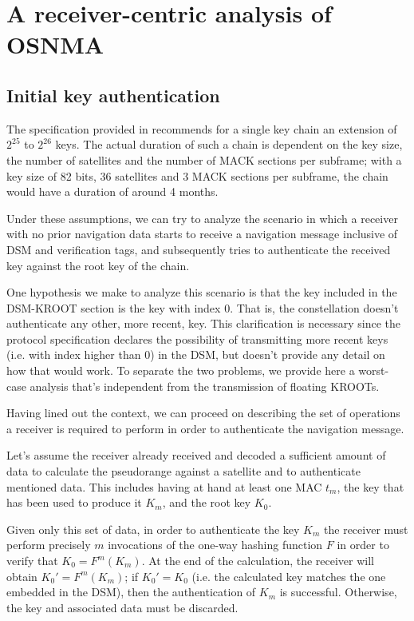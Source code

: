 \chapter{A receiver-centric analysis of OSNMA}

\section{Initial key authentication}
The specification provided in \cite{osnma} recommends for a single key chain
an extension of $2^{25}$ to $2^{26}$ keys. The actual duration of such a chain
is dependent on the key size, the number of satellites and the number of MACK
sections per subframe; with a key size of 82 bits, 36 satellites and 3 MACK
sections per subframe, the chain would have a duration of around 4 months.

Under these assumptions, we can try to analyze the scenario in which a receiver
with no prior navigation data starts to receive a navigation message inclusive
of DSM and verification tags, and subsequently tries to authenticate the
received key against the root key of the chain.

One hypothesis we make to analyze this scenario is that the key included in the
DSM-KROOT section is the key with index $0$. That is, the constellation doesn't
authenticate any other, more recent, key. This clarification is necessary since
the protocol specification declares the possibility of transmitting more recent
keys (i.e. with index higher than $0$) in the DSM, but doesn't provide any
detail on how that would work. To separate the two problems, we provide here a
worst-case analysis that's independent from the transmission of floating KROOTs.

\par

Having lined out the context, we can proceed on describing the set of operations
a receiver is required to perform in order to authenticate the navigation
message.

Let's assume the receiver already received and decoded a sufficient amount of
data to calculate the pseudorange against a satellite and to authenticate
mentioned data. This includes having at hand at least one MAC $t_m$, the key that
has been used to produce it $K_m$, and the root key $K_0$.

Given only this set of data, in order to authenticate the key $K_m$ the
receiver must perform precisely $m$ invocations of the one-way hashing function
$F$ in order to verify that $K_0 = F^m(K_m)$. At the end of the calculation, the
receiver will obtain $K_0' = F^m(K_m)$; if $K_0' = K_0$ (i.e. the calculated key
matches the one embedded in the DSM), then the authentication of $K_m$ is
successful. Otherwise, the key and associated data must be discarded.

